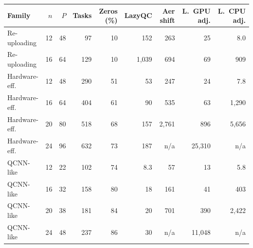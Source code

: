 \begin{tabular}{lrrrrrrrr}
\toprule
Family & $n$ & $P$ & Tasks & Zeros (\%) & LazyQC & Aer shift & L.\ GPU adj. & L.\ CPU adj.\\
\midrule
Re-uploading & 12 & 48 & 97 & 10 & 152 & 263 & 25 & 8.0\\
Re-uploading & 16 & 64 & 129 & 10 & 1{,}039 & 694 & 69 & 909\\
Hardware-eff. & 12 & 48 & 290 & 51 & 53 & 247 & 24 & 7.8\\
Hardware-eff. & 16 & 64 & 404 & 61 & 90 & 535 & 63 & 1{,}290\\
Hardware-eff. & 20 & 80 & 518 & 68 & 157 & 2{,}761 & 896 & 5{,}656\\
Hardware-eff. & 24 & 96 & 632 & 73 & 187 & n/a & 25{,}310 & n/a\\
QCNN-like & 12 & 22 & 102 & 74 & 8.3 & 57 & 13 & 5.8\\
QCNN-like & 16 & 32 & 158 & 80 & 18 & 161 & 41 & 403\\
QCNN-like & 20 & 38 & 181 & 84 & 20 & 701 & 390 & 2{,}422\\
QCNN-like & 24 & 48 & 237 & 86 & 30 & n/a & 11{,}048 & n/a\\
\bottomrule
\end{tabular}
